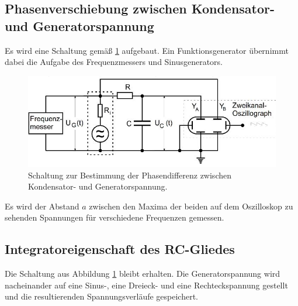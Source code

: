 \subsection{Phasenverschiebung zwischen Kondensator- und Generatorspannung}
Es wird eine Schaltung gemäß \ref{fig:c}
aufgebaut. Ein Funktionsgenerator übernimmt dabei die Aufgabe des Frequenzmessers und Sinusgenerators.
\begin{figure}
\centering
\includegraphics[scale=0.6]{content/images/c.jpg}
\caption{Schaltung zur Bestimmung der Phasendifferenz zwischen Kondensator- und Generatorspannung.\cite{V353}}
\label{fig:c}
\end{figure}
\newline Es wird der Abstand $a$ zwischen den Maxima der beiden auf dem Oszilloskop zu sehenden Spannungen für verschiedene Frequenzen gemessen.
\subsection{Integratoreigenschaft des RC-Gliedes}
Die Schaltung aus Abbildung \ref{fig:c} bleibt erhalten.
Die Generatorspannung wird nacheinander auf eine Sinus-, eine Dreieck- und eine Rechteckspannung gestellt und die resultierenden Spannungsverläufe gespeichert.